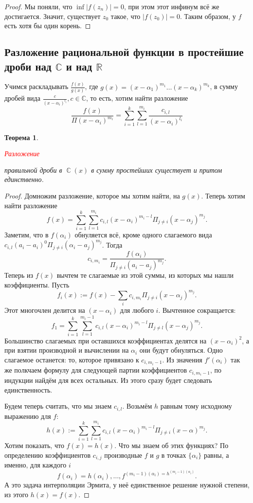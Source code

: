 \documentclass[a4paper,100pt]{article}
\theoremstyle{indented}
\newtheorem{theorem}{Теорема}
\theoremstyle{definition}
\theoremstyle{remark}
\DeclareMathOperator{\CC}{\mathbb{C}}
\begin{document}
\begin{proof}
    Мы поняли, что $\inf \vert f(z_n)\vert=0$, при этом этот инфинум всё же достигается. Значит, существует $z_0$ такое, что $\vert f(z_0)\vert =0$. Таким образом, у $f$ есть хотя бы один корень.  
\end{proof}

\resetall

\subsection{Разложение рациональной функции в простейшие дроби над $\mathbb{C}$ и над $\mathbb{R}$}

Учимся раскладывать $\frac{f(x)}{g(x)}$, где $g(x)=(x-\alpha_1)^{m_1}\dots(x-\alpha_k)^{m_k}$,   в сумму дробей вида $\frac{c}{(x-\alpha_i)^{l_i}}, c\in\mathbb{C}$, то есть, хотим найти разложение
\[
    \frac{f(x)}{\Pi(x-\alpha_i)^{m_i}}=\sum_{i=1}^k\sum_{l=1}^{m_i} \frac{c_{i, l}}{(x-\alpha_i)^{l_i}}
\]

\begin{theorem}
    \hypertarget{n41}{\textcolor{red}{\textit{Разложение}}} правильной дроби в $\CC(x)$ в сумму простейших существует и притом единственно.
\end{theorem}

\begin{proof}
    Домножим разложение, которое мы хотим найти, на $g(x)$. Теперь хотим найти разложение
    \[
        f(x)=\sum_{i=1}^k\sum_{l=1}^{m_i}c_{i, l}(x-\alpha_i)^{m_i-l}\Pi_{j\neq i}(x-\alpha_j)^{m_j}.
    \]
    Заметим, что в $f(\alpha_i)$ обнуляется всё, кроме одного слагаемого вида $c_{i, l}(a_i-a_i)^0\Pi_{j\neq i}(\alpha_i-a_j)^{m_j}$. Тогда 
    \[
        c_{i, m_i}=\frac{f(\alpha_i)}{\Pi_{j\neq i}(a_i-a_j)^{m_j}}.
    \]
    Теперь из $f(x)$ вычтем те слагаемые из этой суммы, из которых мы нашли коэффициенты. Пусть 
    \[
        f_i(x):=f(x)-\sum_i c_{i, m_i}\Pi_{j\neq i}(x-\alpha_j)^{m_j}.
    \]
    Этот многочлен делится на $(x-\alpha_i)$ для любого $i$. Вычтенное сокращается:
    \[
        f_1=\sum_{i=1}^k\sum_{l=1}^{m_i-1}c_{i, l}(x-\alpha_i)^{m_i-l}\Pi_{j\neq l}(x-\alpha_j)^{m_j}.
    \]
    Большинство слагаемых при оставшихся коэффициентах делятся на $(x-\alpha_i)^2$, а при взятии производной и вычислении на $\alpha_i$ они будут обнуляться. Одно слагаемое останется: то, которое привязано к $c_{i, m_i-1}$. Из значения $f'(\alpha_i)$ так же полкчаем формулу для следующей партии коэффициентов $c_{i, m_i-1}$, по индукции найдём для всех остальных. Из этого сразу будет следовать единственность.\ 

    Будем теперь считать, что мы знаем $c_{i, l}$. Возьмём $h$ равным тому исходному выражению для $f$:
    \[
        h(x):=\sum_{i=1}^k\sum_{l=1}^{m_i}c_{i, l}(x-\alpha_i)^{m_i-l}\Pi_{j\neq i}(x-\alpha)^{m_j}.
    \]
    Хотим показать, что $f(x)=h(x)$. Что мы знаем об этих функциях? По определению коэффициентов $c_{i,j}$ производные $f$ и $g$ в точках $\{\alpha_i\}$ равны, а именно, для каждого $i$
    \[
        f(\alpha_i)=h(\alpha_i), \dots, f^{(m_i-1)(\alpha_i)=h^{(m_i-1)(\alpha_i)}}.
    \]
    А это задача интерполяции Эрмита, у неё единственное решение нужной степени, из этого $h(x)=f(x)$.
\end{proof}
\end{document}
